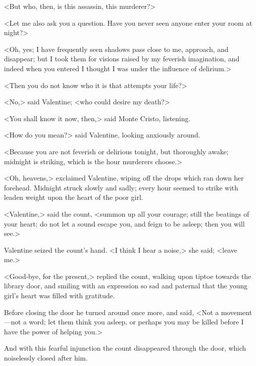  <But who, then, is this assassin, this murderer?> 

 <Let me also ask you a question. Have you never seen anyone enter your room at night?> 

 <Oh, yes; I have frequently seen shadows pass close to me, approach, and disappear; but I took them for visions raised by my feverish imagination, and indeed when you entered I thought I was under the influence of delirium.> 

 <Then you do not know who it is that attempts your life?>

<No,> said Valentine; <who could desire my death?> 

 <You shall know it now, then,> said Monte Cristo, listening. 

 <How do you mean?> said Valentine, looking anxiously around. 

 <Because you are not feverish or delirious tonight, but thoroughly awake; midnight is striking, which is the hour murderers choose.> 

 <Oh, heavens,> exclaimed Valentine, wiping off the drops which ran down her forehead. Midnight struck slowly and sadly; every hour seemed to strike with leaden weight upon the heart of the poor girl. 

 <Valentine,> said the count, <summon up all your courage; still the beatings of your heart; do not let a sound escape you, and feign to be asleep; then you will see.> 

 Valentine seized the count's hand. <I think I hear a noise,> she said; <leave me.> 

 <Good-bye, for the present,> replied the count, walking upon tiptoe towards the library door, and smiling with an expression so sad and paternal that the young girl's heart was filled with gratitude. 

 Before closing the door he turned around once more, and said, <Not a movement—not a word; let them think you asleep, or perhaps you may be killed before I have the power of helping you.> 

 And with this fearful injunction the count disappeared through the door, which noiselessly closed after him. 